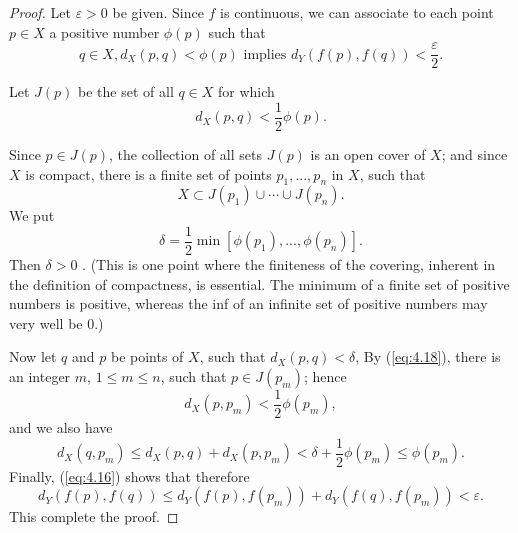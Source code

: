 \begin{proof}
    Let $\varepsilon > 0$ be given.
    Since $f$ is continuous, we can associate to each point $p \in X$ a positive number $\phi(p)$ such that
    \begin{equation}
        \label{eq:4.16}
        q\in X, d_X(p, q) < \phi(p)
        \text{ implies }
        d_Y (f(p), f(q)) < \frac{\varepsilon}{2}.
    \end{equation}

    Let $J(p)$ be the set of all $q \in X$ for which
    \begin{equation}
        \label{eq:4.17}
        d_X(p, q) < \frac{1}{2}\phi(p).
    \end{equation}

    Since $p \in J(p)$, the collection of all sets $J(p)$ is an open cover of $X$;
    and since $X$ is compact, there is a finite set of points $p_1,...,p_n$ in $X$, such that
    \begin{equation}
        \label{eq:4.18}
        X \subset J(p_1) \cup \cdots \cup J(p_n).
    \end{equation}
    We put
    \begin{equation}
        \delta = \frac{1}{2} \min [\phi(p_1), ..., \phi(p_n)].
    \end{equation}
    Then $\delta > 0$ .
    (This is one point where the finiteness of the covering,
    inherent in the definition of compactness, is essential.
    The minimum of a finite set of positive numbers is positive,
    whereas the inf of an infinite set of positive numbers may very well be 0.)

    Now let $q$ and $p$ be points of $X$, such that $d_X(p, q) < \delta$,
    By (\ref{eq:4.18}), there is an integer $m$, $1 \leq m \leq n$,
    such that $p \in J(p_m)$; hence
    \begin{equation}
        \label{eq:4.20}
        d_X(p, p_m) < \frac{1}{2}\phi(p_m),
    \end{equation}
    and we also have
    \begin{equation*}
        d_X(q, p_m) \leq
        d_X(p, q) +
        d_X(p, p_m) <
        \delta + \frac{1}{2}\phi(p_m) \leq
        \phi(p_m).
    \end{equation*}
    Finally, (\ref{eq:4.16}) shows that therefore
    \begin{equation*}
        d_Y(f(p), f(q)) \leq
        d_Y(f(p), f(p_m)) +
        d_Y(f(q), f(p_m)) <
        \varepsilon .
    \end{equation*}
    This complete the proof.
\end{proof}

